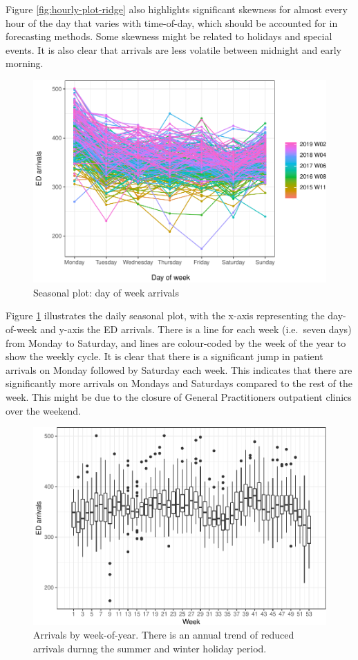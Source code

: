 \documentclass[]{elsarticle} %
\begin{document}
Figure \ref{fig:hourly-plot-ridge} also highlights significant skewness for almost every hour of the day that varies with time-of-day, which should be accounted for in forecasting methods. Some skewness might be related to holidays and special events. It is also clear that arrivals are less volatile between midnight and early morning.

\begin{figure}[H]

{\centering \includegraphics[width=0.7\linewidth]{paper_files/figure-latex/seasonplot-dofw-1} 

}

\caption{Seasonal plot: day of week arrivals}\label{fig:seasonplot-dofw}
\end{figure}

Figure \ref{fig:seasonplot-dofw} illustrates the daily seasonal plot, with the x-axis representing the day-of-week and y-axis the ED arrivals. There is a line for each week (i.e.~seven days) from Monday to Saturday, and lines are colour-coded by the week of the year to show the weekly cycle. It is clear that there is a significant jump in patient arrivals on Monday followed by Saturday each week. This indicates that there are significantly more arrivals on Mondays and Saturdays compared to the rest of the week. This might be due to the closure of General Practitioners outpatient clinics over the weekend.

\begin{figure}[H]

{\centering \includegraphics[width=0.7\linewidth]{paper_files/figure-latex/seasonplot-weekofyear-1} 

}

\caption{Arrivals by week-of-year. There is an annual trend of reduced arrivals durnng the summer and winter holiday period.}\label{fig:seasonplot-weekofyear}
\end{figure}
\end{document}
